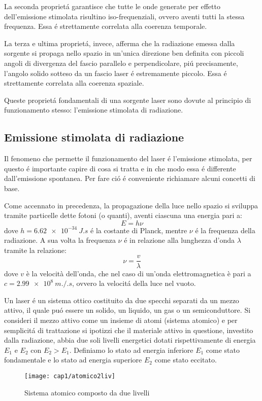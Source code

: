 La seconda propriet\'a garantisce che %
tutte le onde generate per effetto dell'emissione stimolata risultino iso-frequenziali, ovvero aventi tutti la stessa frequenza. Essa \'e strettamente correlata alla coerenza temporale.

La terza e ultima propriet\'a, invece, afferma che la radiazione emessa dalla sorgente si propaga nello spazio in un'unica direzione ben definita con piccoli angoli di divergenza del fascio parallelo e perpendicolare, pi\'u precisamente, l'angolo solido sotteso da un fascio laser \'e estremamente piccolo. Essa \'e strettamente correlata alla coerenza spaziale.

Queste propriet\'a fondamentali di una sorgente laser sono dovute al principio di funzionamento stesso: l'emissione stimolata di radiazione.

\subsection{Emissione stimolata di radiazione}
Il fenomeno che permette il funzionamento del laser \'e l'emissione stimolata, per questo \'e importante capire di cosa si tratta e in che modo essa \'e differente dall'emissione spontanea. Per fare ci\'o \'e conveniente richiamare alcuni concetti di base.

Come accennato in precedenza, la propagazione della luce nello spazio si sviluppa tramite particelle dette fotoni (o quanti), aventi ciascuna una energia pari a:
\begin{equation}
E=h\nu
\end{equation}
dove $h= \SI{6.62e-34}{J.s}$ \'e la costante di Planck, mentre $\nu$ \'e la frequenza della radiazione. A sua volta la frequenza $\nu$ \'e in relazione alla lunghezza d'onda $\lambda$ tramite la relazione:
\begin{equation}
\nu= \frac{v}{\lambda}
\end{equation}
dove $v$ è la velocità dell'onda, che nel caso di un'onda elettromagnetica è pari a $c= \SI{2.99e8}{m.\per.s}$, ovvero la velocit\'a della luce nel vuoto.

Un laser \'e un sistema ottico costituito da due specchi separati da un mezzo attivo, il quale pu\'o essere un solido, un liquido, un gas o un semiconduttore. Si consideri il mezzo attivo come un insieme di atomi (sistema atomico) e per semplicit\'a di trattazione si ipotizzi che il materiale attivo in questione, investito dalla radiazione, abbia due soli livelli energetici dotati rispettivamente di energia $E_{1}$ e $E_{2}$ con $E_{2}>E_{1}$. Definiamo lo stato ad energia inferiore $E_{1}$ come stato fondamentale e lo stato ad energia superiore $E_{2}$ come stato eccitato.
\begin{figure}[H]
  \begin{center}
    \texttt{[image: cap1/atomico2liv]}
    \caption{Sistema atomico composto da due livelli}
    \label{atomico2liv}
  \end{center}
\end{figure}


